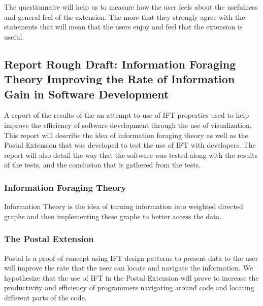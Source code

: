 \documentclass[letterpaper,10pt,titlepage,draftclsnofoot,onecolumn,onesided] {IEEEtran}
\begin{document}
	The questionnaire will help us to measure how the user feels about the usefulness and general feel of the extension. 
	The more that they strongly agree with the statements that will mean that the users enjoy and feel that the extension is useful.

	\subsection{Report Rough Draft: Information Foraging Theory Improving the Rate of Information Gain in Software Development}
	A report of the results of the an attempt to use of IFT properties used to help improve the efficiency of software development through the use of visualization. This report will describe the idea of information foraging theory as well as the Postal Extension that was developed to test the use of IFT with developers. The report will also detail the way that the software was tested along with the results of the tests, and the conclusion that is gathered from the tests. 
	
	\subsubsection{Information Foraging Theory}
	Information Theory is the idea of turning information into weighted directed graphs and then implementing these graphs to better access the data.
	
	\subsubsection{The Postal Extension}
	Postal is a proof of concept using IFT design patterns to present data to the user will improve the rate that the user can locate and navigate the information.
	We hypothesize that the use of IFT in the Postal Extension will prove to increase the productivity and efficiency of programmers navigating around code and locating different parts of the code.  
	
\end{document}
